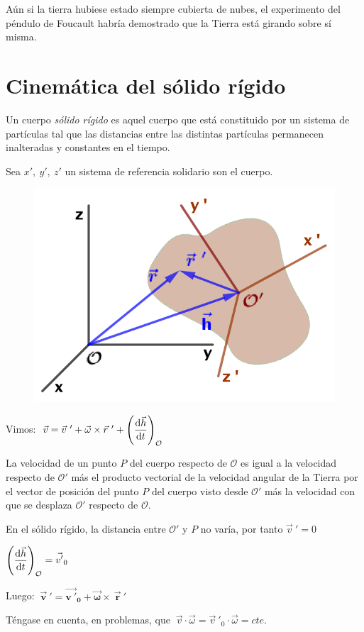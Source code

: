 \begin{miparrafo}
Aún si la tierra hubiese estado siempre cubierta de nubes, el experimento del péndulo de Foucault habría demostrado que la Tierra está girando sobre sí misma.	
\end{miparrafo}



\section{Cinemática del sólido rígido}

Un cuerpo \emph{sólido rígido} es aquel cuerpo que está constituido por un sistema de partículas tal que las distancias entre las distintas partículas permanecen inalteradas y constantes en el tiempo.

Sea $x', \ y',\ z'$ un sistema de referencia solidario son el cuerpo. 
\begin{figure}[H]
	\centering
	\includegraphics[width=.4\textwidth]{imagenes/imagenes11/T11IM14.png}
\end{figure}

Vimos: $\ \vec v=\vec v\ '+\vec \omega \times \vec r\ '+ \displaystyle \left( \dv{\vec h}{t} \right)_{\mathcal O}$

La velocidad de un punto $P$ del cuerpo respecto de $\mathcal {O}$ es igual a la velocidad respecto de $\mathcal {O'}$ más el producto vectorial de la velocidad angular de la Tierra por el vector de posición del punto $P$ del cuerpo visto desde $\mathcal{O'}$ más la velocidad con que se desplaza $\mathcal{O'}$ respecto de $\mathcal{O}$.

En el sólido rígido, la distancia entre $\mathcal {O'}$ y $P$ no varía, por tanto $\vec v\ '=0$

$\displaystyle \left( \dv{\vec h}{t} \right)_{\mathcal O}=\vec {v'}_0$

Luego: $\ \boldsymbol{ \vec v\ '=\vec {v\ '}_0+\vec \omega \times \	\vec r\ ' }$

\textcolor{gris}{Téngase en cuenta, en problemas, que $\ \vec v\cdot \vec \omega = \vec v\ '_0 \cdot \vec \omega = cte $.}

